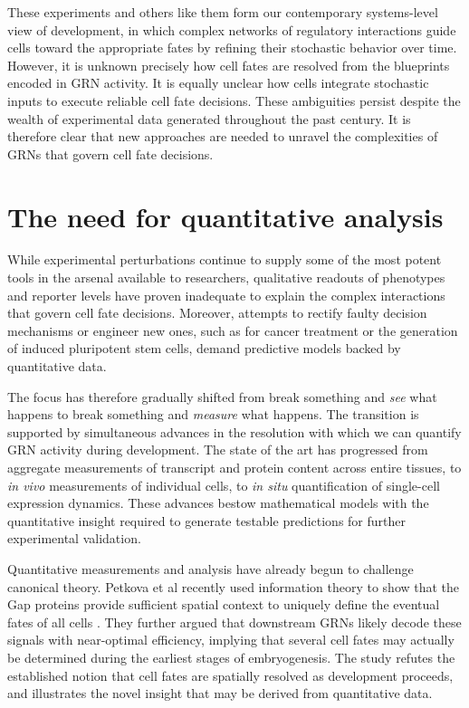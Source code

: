 These experiments and others like them form our contemporary systems-level view of development, in which complex networks of regulatory interactions guide cells toward the appropriate fates by refining their stochastic behavior over time. However, it is unknown precisely how cell fates are resolved from the blueprints encoded in GRN activity. It is equally unclear how cells integrate stochastic inputs to execute reliable cell fate decisions. These ambiguities persist despite the wealth of experimental data generated throughout the past century. It is therefore clear that new approaches are needed to unravel the complexities of GRNs that govern cell fate decisions.

\section{The need for quantitative analysis}

While experimental perturbations continue to supply some of the most potent tools in the arsenal available to researchers, qualitative readouts of phenotypes and reporter levels have proven inadequate to explain the complex interactions that govern cell fate decisions. Moreover, attempts to rectify faulty decision mechanisms or engineer new ones, such as for cancer treatment or the generation of induced pluripotent stem cells, demand predictive models backed by quantitative data.

The focus has therefore gradually shifted from break something and \textit{see} what happens to break something and \textit{measure} what happens. The transition is supported by simultaneous advances in the resolution with which we can quantify GRN activity during development. The state of the art has progressed from aggregate measurements of transcript and protein content across entire tissues, to \emph{in vivo} measurements of individual cells, to \emph{in situ} quantification of single-cell expression dynamics. These advances bestow mathematical models with the quantitative insight required to generate testable predictions for further experimental validation.

Quantitative measurements and analysis have already begun to challenge canonical theory. Petkova et al recently used information theory to show that the Gap proteins provide sufficient spatial context to uniquely define the eventual fates of all cells \cite{Petkova2019}. They further argued that downstream GRNs likely decode these signals with near-optimal efficiency, implying that several cell fates may actually be determined during the earliest stages of embryogenesis. The study refutes the established notion that cell fates are spatially resolved as development proceeds, and illustrates the novel insight that may be derived from quantitative data.

